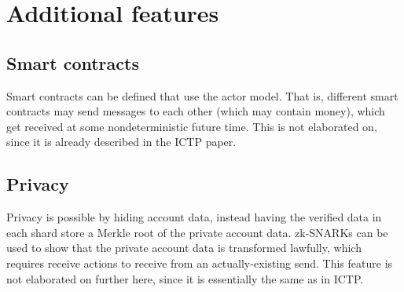 \documentclass{article}
\begin{document}
\section{Additional features}

  \subsection{Smart contracts}

  Smart contracts can be defined that use the actor model.  That is, different smart contracts may send messages to each other (which may contain money), which get received at some nondeterministic future time.  This is not elaborated on, since it is already described in the ICTP paper.

  \subsection{Privacy}

  Privacy is possible by hiding account data, instead having the verified data in each shard store a Merkle root of the private account data.  zk-SNARKs can be used to show that the private account data is transformed lawfully, which requires receive actions to receive from an actually-existing send.  This feature is not elaborated on further here, since it is essentially the same as in ICTP.
\end{document}
